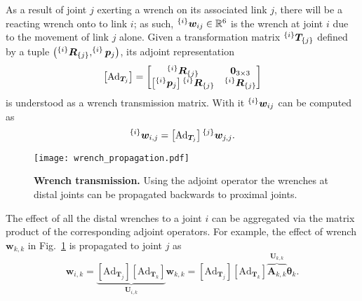 As a result of joint $j$ exerting a wrench on its associated link $j$, there will be a reacting wrench onto to link $i$; as such, $^{\left\lbrace i \right\rbrace}\bm{w}_{ij} \in \mathbb{R}^6$ is the wrench at joint $i$ due to the movement of link $j$ alone. Given a transformation matrix $^{\left\lbrace i \right\rbrace}\bm{T}_{\left\lbrace j \right\rbrace}$ defined by a tuple $\left(^{\left\lbrace i \right\rbrace}\bm{R}_{\left\lbrace j \right\rbrace},^{\left\lbrace i \right\rbrace}\bm{p}_j\right)$, its adjoint representation \cite{Lynch2017Modernrobotics}
\begin{equation}
	\left[\text{Ad}_{\bm{T}_j}\right] =  
	\begin{bmatrix}
		^{\left\lbrace i \right\rbrace}\bm{R}_{\left\lbrace j \right\rbrace} & \bm{0}_{3\times 3} \\
		\left[^{\left\lbrace i \right\rbrace}\bm{p}_j\right]{}^{\left\lbrace i \right\rbrace}\bm{R}_{\left\lbrace j \right\rbrace} & ^{\left\lbrace i \right\rbrace}\bm{R}_{\left\lbrace j \right\rbrace}
	\end{bmatrix}
\end{equation}
is understood as a wrench transmission matrix. With it $^{\left\lbrace i \right\rbrace}\bm{w}_{ij}$ can be computed as
\begin{equation}
		^{\left\lbrace i \right\rbrace}\bm{w}_{i,j}= \left[\text{Ad}_{\bm{T}_j}\right]{}^{\left\lbrace j \right\rbrace}\bm{w}_{j,j}.
\end{equation}

\begin{figure}[t!]
	\begin{center}
		\texttt{[image: wrench\_propagation.pdf]}
		\caption{\textbf{Wrench transmission.} Using the adjoint operator the wrenches at distal joints can be propagated backwards to proximal joints.}
		\label{fig:wrench_propagation}
	\end{center}
\end{figure}
The effect of all the distal wrenches to a joint $i$ can be aggregated via the matrix product of the corresponding adjoint operators. For example, the effect of wrench $\bm{w}_{k,k}$ in Fig.~\ref{fig:wrench_propagation} is propagated to joint $j$ as
\begin{equation}
	\bm{w}_{i,k} = \underbrace{\left[\text{Ad}_{\bm{T}_{j}}\right]\left[\text{Ad}_{\bm{T}_{k}}\right]}_{\bm{U}_{i,k}}\bm{w}_{k,k} = \left[\text{Ad}_{\bm{T}_{j}}\right]\left[\text{Ad}_{\bm{T}_{k}}\right]\overbrace{\bm{A}_{k,k}}^{\bm{U}_{k,k}}\bm{\theta}_k.
	\label{eq:ext_wrench}
\end{equation}

